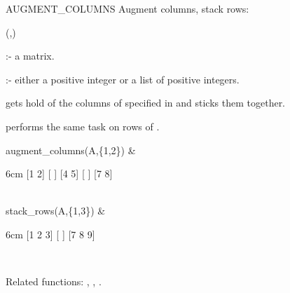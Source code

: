 \begin{Operator}[augmentcolumns]{AUGMENT_COLUMNS}
Augment columns, stack rows:

\begin{Syntax}
(,)
\end{Syntax}

       :- a matrix. 

 :-  either a positive integer or a list of positive 
                        integers. 

 gets hold of the columns of  
specified in  and sticks them together. 

 performs the same task on rows of .

\begin{Examples}

augment_columns(A,\{1,2\}) &
\begin{multilineoutput}{6cm} 
[1  2]
[    ]
[4  5]
[    ]
[7  8]
\end{multilineoutput} \\

stack_rows(A,\{1,3\}) &
\begin{multilineoutput}{6cm}
[1  2  3]
[       ]
[7  8  9]
\end{multilineoutput} \\
\end{Examples}

Related functions:
,  , .

\end{Operator}


